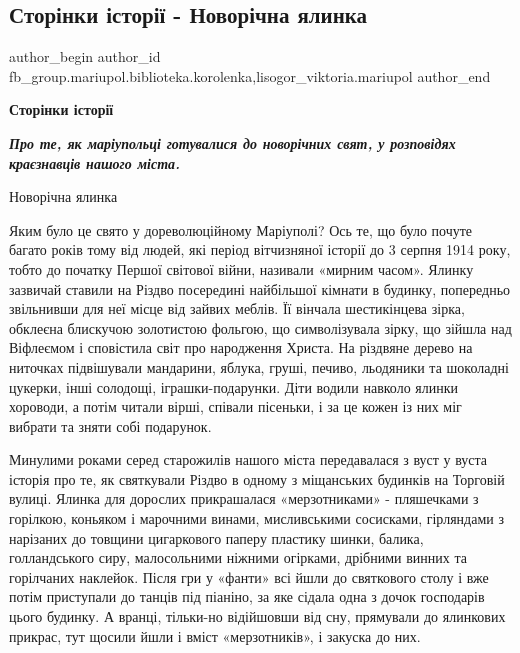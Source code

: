  
 
 
 
 

\subsection{Сторінки історії - Новорічна ялинка}
\label{sec:19_12_2022.fb.fb_group.mariupol.biblioteka.korolenka.1.stor_nki__stor____n}
 
\ifcmt
 author_begin
   author_id fb_group.mariupol.biblioteka.korolenka,lisogor_viktoria.mariupol
 author_end
\fi

\textbf{Сторінки історії}

\begingroup
\em\bfseries
Про те, як маріупольці готувалися до новорічних свят, у розповідях краєзнавців нашого міста.

Новорічна ялинка
\endgroup

Яким було це свято у дореволюційному Маріуполі? Ось те, що було почуте багато
років тому від людей, які період вітчизняної історії до 3 серпня 1914 року,
тобто до початку Першої світової війни, називали «мирним часом». Ялинку
зазвичай ставили на Різдво посередині найбільшої кімнати в будинку, попередньо
звільнивши для неї місце від зайвих меблів. Її вінчала шестикінцева зірка,
обклеєна блискучою золотистою фольгою, що символізувала зірку, що зійшла над
Віфлеємом і сповістила світ про народження Христа. На різдвяне дерево на
ниточках підвішували мандарини, яблука, груші, печиво, льодяники та шоколадні
цукерки, інші солодощі, іграшки-подарунки. Діти водили навколо ялинки хороводи,
а потім читали вірші, співали пісеньки, і за це кожен із них міг вибрати та
зняти собі подарунок.

Минулими роками серед старожилів нашого міста передавалася з вуст у вуста
історія про те, як святкували Різдво в одному з міщанських будинків на Торговій
вулиці. Ялинка для дорослих прикрашалася «мерзотниками» - пляшечками з
горілкою, коньяком і марочними винами, мисливськими сосисками, гірляндами з
нарізаних до товщини цигаркового паперу пластику шинки, балика, голландського
сиру, малосольними ніжними огірками, дрібними винних та горілчаних наклейок.
Після гри у «фанти» всі йшли до святкового столу і вже потім приступали до
танців під піаніно, за яке сідала одна з дочок господарів цього будинку. А
вранці, тільки-но відійшовши від сну, прямували до ялинкових прикрас, тут
щосили йшли і вміст «мерзотників», і закуска до них.

